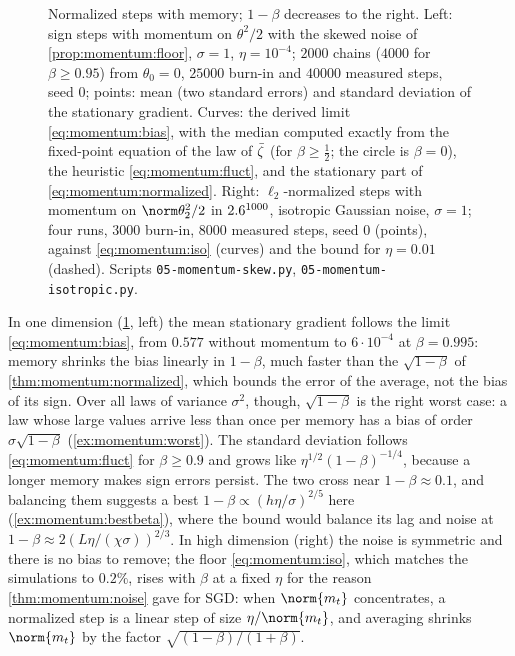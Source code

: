 \begin{refsection}
\begin{figure}[t]
\caption{Normalized steps with memory; $1-\beta$ decreases to the right. Left: sign steps with momentum on $\theta^2/2$ with the skewed noise of \cref{prop:momentum:floor}, $\sigma=1$, $\eta=10^{-4}$; $2000$ chains ($4000$ for $\beta\ge0.95$) from $\theta_0=0$, $25000$ burn-in and $40000$ measured steps, seed $0$; points: mean (two standard errors) and standard deviation of the stationary gradient. Curves: the derived limit \eqref{eq:momentum:bias}, with the median computed exactly from the fixed-point equation of the law of $\bar\zeta$ (for $\beta\ge\frac12$; the circle is $\beta=0$), the heuristic \eqref{eq:momentum:fluct}, and the stationary part of \eqref{eq:momentum:normalized}. Right: $\ell_2$-normalized steps with momentum on $\norm\theta_2^2/2$ in $2.6^{1000}$, isotropic Gaussian noise, $\sigma=1$; four runs, $3000$ burn-in, $8000$ measured steps, seed $0$ (points), against \eqref{eq:momentum:iso} (curves) and the bound for $\eta=0.01$ (dashed). Scripts \texttt{05-momentum-skew.py}, \texttt{05-momentum-isotropic.py}.}
\label{fig:momentum:normalized}
\end{figure}

In one dimension (\cref{fig:momentum:normalized}, left) the mean stationary gradient follows the limit \eqref{eq:momentum:bias}, from $0.577$ without momentum to $6\cdot10^{-4}$ at $\beta=0.995$: memory shrinks the bias linearly in $1-\beta$, much faster than the $\sqrt{1-\beta}$ of \cref{thm:momentum:normalized}, which bounds the error of the average, not the bias of its sign. Over all laws of variance $\sigma^2$, though, $\sqrt{1-\beta}$ is the right worst case: a law whose large values arrive less than once per memory has a bias of order $\sigma\sqrt{1-\beta}$ (\cref{ex:momentum:worst}). The standard deviation follows \eqref{eq:momentum:fluct} for $\beta\ge0.9$ and grows like $\eta^{1/2}(1-\beta)^{-1/4}$, because a longer memory makes sign errors persist. The two cross near $1-\beta\approx0.1$, and balancing them suggests a best $1-\beta\propto(h\eta/\sigma)^{2/5}$ here (\cref{ex:momentum:bestbeta}), where the bound would balance its lag and noise at $1-\beta\approx2(L\eta/(\chi\sigma))^{2/3}$. In high dimension (right) the noise is symmetric and there is no bias to remove; the floor \eqref{eq:momentum:iso}, which matches the simulations to $0.2\%$, rises with $\beta$ at a fixed $\eta$ for the reason \cref{thm:momentum:noise} gave for SGD: when $\norm{m_t}$ concentrates, a normalized step is a linear step of size $\eta/\norm{m_t}$, and averaging shrinks $\norm{m_t}$ by the factor $\sqrt{(1-\beta)/(1+\beta)}$.


\end{refsection}
